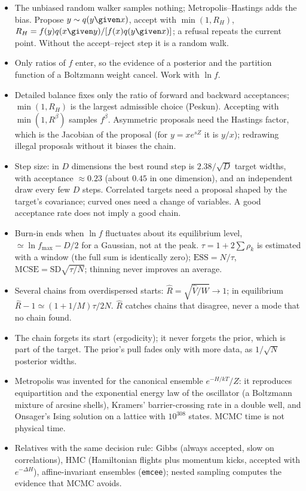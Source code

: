 \begin{recap}
\begin{itemize}
  \item The unbiased random walker samples nothing; Metropolis--Hastings adds the bias. Propose
        $y\sim q(y\given x)$, accept with $\min(1,R_H)$,
        $R_H=f(y)q(x\given y)/[f(x)q(y\given x)]$; a refusal repeats the current point. Without
        the accept--reject step it is a random walk.
  \item Only ratios of $f$ enter, so the evidence of a posterior and the partition function of a
        Boltzmann weight cancel. Work with $\ln f$.
  \item Detailed balance fixes only the ratio of forward and backward acceptances; $\min(1,R_H)$ is
        the largest admissible choice (Peskun). Accepting with $\min(1,R^\beta)$ samples $f^\beta$.
        Asymmetric proposals need the Hastings factor, which is the Jacobian of the proposal (for
        $y=xe^{sZ}$ it is $y/x$); redrawing illegal proposals without it biases the chain.
  \item Step size: in $D$ dimensions the best round step is $2.38/\sqrt D$ target widths, with
        acceptance $\approx0.23$ (about $0.45$ in one dimension), and an independent draw every
        few $D$ steps. Correlated targets need a proposal shaped by the target's covariance; curved
        ones need a change of variables. A good acceptance rate does not imply a good chain.
  \item Burn-in ends when $\ln f$ fluctuates about its equilibrium level, $\simeq\ln f_{\max}-D/2$
        for a Gaussian, not at the peak. $\tau=1+2\sum\rho_k$ is estimated with a window (the full
        sum is identically zero); $\mathrm{ESS}=N/\tau$, $\mathrm{MCSE}=\mathrm{SD}\sqrt{\tau/N}$;
        thinning never improves an average.
  \item Several chains from overdispersed starts: $\hat R=\sqrt{\hat V/W}\to1$; in equilibrium
        $\hat R-1\simeq(1+1/M)\tau/2N$. $\hat R$ catches chains that disagree, never a mode that no
        chain found.
  \item The chain forgets its start (ergodicity); it never forgets the prior, which is part of the
        target. The prior's pull fades only with more data, as $1/\sqrt N$ posterior widths.
  \item Metropolis was invented for the canonical ensemble $e^{-H/kT}/Z$: it reproduces
        equipartition and the exponential energy law of the oscillator (a Boltzmann mixture of
        arcsine shells), Kramers' barrier-crossing rate in a double well, and Onsager's Ising
        solution on a lattice with $10^{308}$ states. MCMC time is not physical time.
  \item Relatives with the same decision rule: Gibbs (always accepted, slow on correlations),
        HMC (Hamiltonian flights plus momentum kicks, accepted with $e^{-\Delta H}$), affine-invariant
        ensembles (\texttt{emcee}); nested sampling computes the evidence that MCMC avoids.
\end{itemize}
\end{recap}
